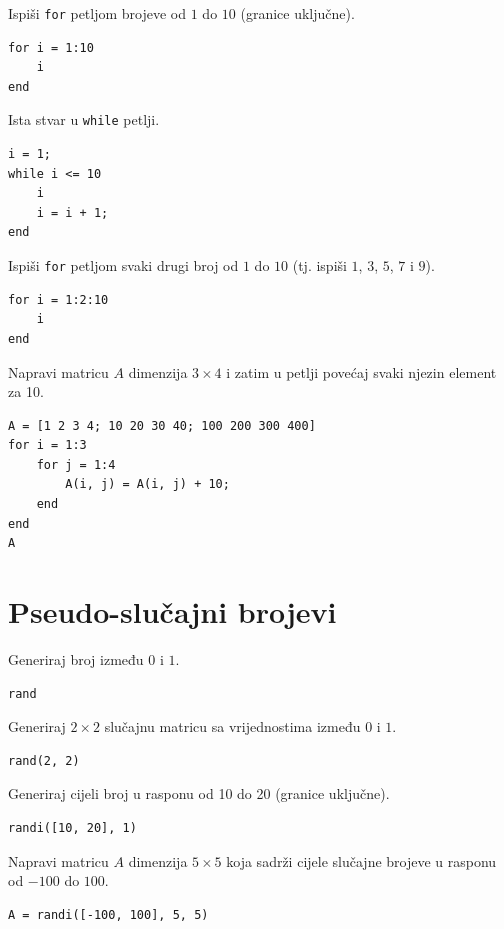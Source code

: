 \documentclass[a4paper, 10pt]{article}
\begin{document}
Ispiši \texttt{for} petljom brojeve od $1$ do $10$ (granice uključne).

\begin{lstlisting}
for i = 1:10
    i
end
\end{lstlisting}

Ista stvar u \texttt{while} petlji.

\begin{lstlisting}
i = 1;
while i <= 10
    i
    i = i + 1;
end
\end{lstlisting}

Ispiši \texttt{for} petljom svaki drugi broj od $1$ do $10$ (tj. ispiši $1$, $3$, $5$, $7$ i $9$).

\begin{lstlisting}
for i = 1:2:10
    i
end
\end{lstlisting}

Napravi matricu $A$ dimenzija $3 \times 4$ i zatim u petlji povećaj svaki njezin element za 10.

\begin{lstlisting}
A = [1 2 3 4; 10 20 30 40; 100 200 300 400]
for i = 1:3
    for j = 1:4
        A(i, j) = A(i, j) + 10;
    end
end
A
\end{lstlisting}

\section{Pseudo-slučajni brojevi}

Generiraj broj između $0$ i $1$.

\begin{lstlisting}
rand
\end{lstlisting}

Generiraj $2 \times 2$ slučajnu matricu sa vrijednostima između $0$ i $1$. 

\begin{lstlisting}
rand(2, 2)
\end{lstlisting}

Generiraj cijeli broj u rasponu od 10 do 20 (granice uključne).

\begin{lstlisting}
randi([10, 20], 1)
\end{lstlisting}

Napravi matricu $A$ dimenzija $5 \times 5$ koja sadrži cijele slučajne brojeve u rasponu od $-100$ do $100$.

\begin{lstlisting}
A = randi([-100, 100], 5, 5)
\end{lstlisting}
\end{document}
